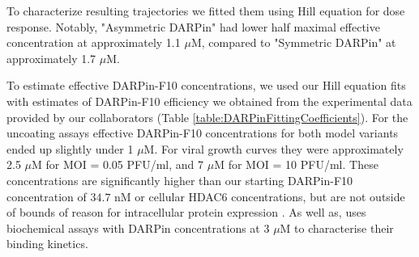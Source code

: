 To characterize resulting trajectories we fitted them using Hill equation for dose response. Notably, "Asymmetric DARPin" had lower half maximal effective concentration at approximately 1.1 $\mu$M, compared to "Symmetric DARPin" at approximately 1.7 $\mu$M.

To estimate effective DARPin-F10 concentrations, we used our Hill equation fits with estimates of DARPin-F10 efficiency we obtained from the experimental data provided by our collaborators \cite{DarpinData} (Table \ref{table:DARPinFittingCoefficients}). For the uncoating assays effective DARPin-F10 concentrations for both model variants ended up slightly under 1 $\mu$M. For viral growth curves they were approximately 2.5 $\mu$M for MOI = 0.05 PFU/ml, and 7 $\mu$M for MOI = 10 PFU/ml. These concentrations are significantly higher than our starting DARPin-F10 concentration of $34.7$ nM or cellular HDAC6 concentrations, but are not outside of bounds of reason for intracellular protein expression \cite{milo_2015}. As well as, \cite{guillard2017structural} uses biochemical assays with DARPin concentrations at 3 $\mu$M to characterise their binding kinetics.